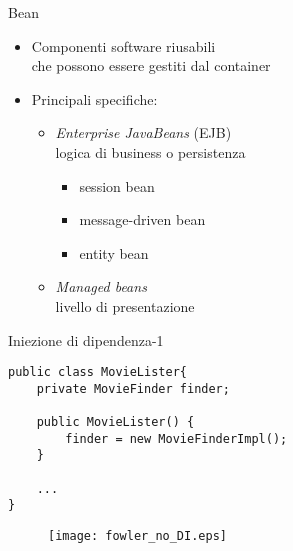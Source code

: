 \begin{frame}{Bean}

\begin{itemize}
\item Componenti software riusabili \\
	che possono essere gestiti dal container

\vspace{1em}

\item Principali specifiche:
	\begin{itemize}
	
	\vspace{0.8em}
	
	\item \textsl{Enterprise JavaBeans} (EJB) \\
		logica di business o persistenza
		
		\begin{itemize}
		
		\vspace{0.5em}
		
		\item session bean
		
		\vspace{0.3em}
		
		\item message-driven bean
		
		\vspace{0.3em}
		
		\item entity bean
		\end{itemize}
	
	\vspace{0.8em}
	
	\item  \textsl{Managed beans}\\
		livello di presentazione
	\end{itemize}

\end{itemize}

\end{frame}





\begin{frame}[fragile]{Iniezione di dipendenza-1}


\begin{lstlisting}[basicstyle={\tiny\ttfamily}]
public class MovieLister{
    private MovieFinder finder;
    
    public MovieLister() {
        finder = new MovieFinderImpl();
    }
    
    ...
}
\end{lstlisting}


\begin{figure}
	\centering
	\texttt{[image: fowler\_no\_DI.eps]}
\end{figure}



\end{frame}



